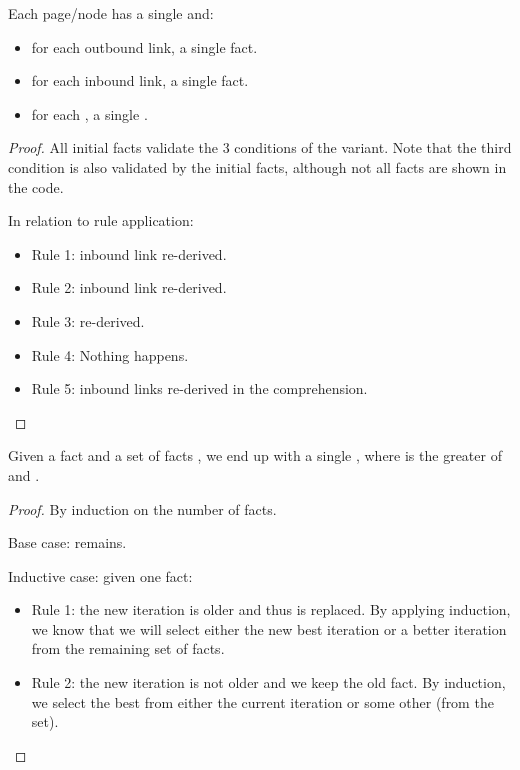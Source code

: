 \begin{invariant}
Each page/node has a single  and:
\begin{itemize}
   \item for each outbound link, a single  fact.
   \item for each inbound link, a single 
      fact.
   \item for each , a single
      .
\end{itemize}
\end{invariant}

\begin{proof}

All initial facts validate the 3 conditions of the variant. Note that the third
condition is also validated by the initial facts, although not all facts are shown in
the code.

In relation to rule application:

\begin{itemize}
   \item Rule 1: inbound link re-derived.
   \item Rule 2: inbound link re-derived.
   \item Rule 3:  re-derived.
   \item Rule 4: Nothing happens.
   \item Rule 5: inbound links re-derived in the comprehension.
\end{itemize}
\end{proof}

\begin{lemma}

Given a fact  and a set of facts
, we end up with a single
, where  is the greater of
 and .

\end{lemma}
\begin{proof}
By induction on the number of  facts.

Base case:  remains.

Inductive case: given one  fact:

\begin{itemize}
   \item Rule 1: the new iteration is older and thus 
   is replaced. By applying induction, we know that we will select either the
   new best iteration or a better iteration from the remaining set of
    facts.
   \item Rule 2: the new iteration is not older and we keep the old
    fact. By induction, we select the best from either
   the current iteration or some other (from the set).
\end{itemize}
\end{proof}

